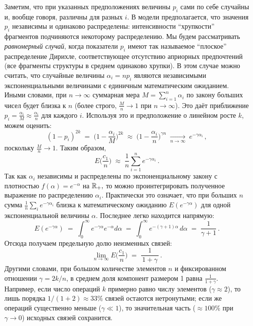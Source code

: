 Заметим, что при указанных предположениях величины $p_i$ сами по себе случайны и, вообще говоря, различны для разных $i$. В модели предполагается, что значения $p_i$ независимы и одинаково распределены: интенсивности ``хрупкости'' фрагментов подчиняются некоторому распределению. Мы будем рассматривать \emph{равномерный случай}, когда показатели $p_i$ имеют так называемое ``плоское'' распределение Дирихле, соответствующее отсутствию априорных предпочтений (все фрагменты структуры в среднем одинаково хрупки). В этом случае можно считать, что случайные величины $\alpha_i = n p_i$ являются независимыми экспоненциальными величинами с единичным математическим ожиданием. Иными словами, при $n \to \infty$ суммарная мера $M = \sum_{i=1}^n \alpha_i$ по закону больших чисел будет близка к $n$ (более строго, $\frac{M}{n} \to 1$ при $n \to \infty$). Это даёт приближение $p_i = \frac{\alpha_i}{M} \approx \frac{\alpha_i}{n}$ для каждого $i$. Используя это и предположение о линейном росте $k$, можем оценить:
\[
(1 - p_i)^{2k} \;=\; \Big(1 - \frac{\alpha_i}{M}\Big)^{2k} \;\approx\; \Big(1 - \frac{\alpha_i}{n}\Big)^{\gamma n} \;\xrightarrow[n \to \infty]{}\; e^{-\gamma \alpha_i}\,,
\] 
поскольку $\frac{M}{n} \to 1$. Таким образом, 
\[
E\!\Big(\frac{c_1}{n}\Big) \;\approx\; \frac{1}{n}\sum_{i=1}^n e^{-\gamma \alpha_i}\,. 
\]
Так как $\alpha_i$ независимы и распределены по экспоненциальному закону с плотностью $f(\alpha) = e^{-\alpha}$ на $\mathbb{R}_+,$ то можно проинтегрировать полученное выражение по распределению $\alpha_i$. Практически это означает, что при больших $n$ сумма $\frac{1}{n}\sum_{i} e^{-\gamma \alpha_i}$ близка к математическому ожиданию $E(e^{-\gamma \alpha})$ для одной экспоненциальной величины $\alpha$. Последнее легко находится напрямую:
\[
E(e^{-\gamma \alpha}) \;=\; \int_{0}^{\infty} e^{-\gamma \alpha} e^{-\alpha} d\alpha \;=\; \int_{0}^{\infty} e^{-(\gamma+1)\alpha}\, d\alpha \;=\; \frac{1}{\gamma+1}\,.
\] 
Отсюда получаем предельную долю неизменных связей:
\[
\lim_{n \to \infty} E\!\Big(\frac{c_1}{n}\Big) \;=\; \frac{1}{\,1 + \gamma\,}\,.
\] 
Другими словами, при большом количестве элементов $n$ и фиксированном отношении $\gamma = 2k/n$, в среднем доля компонент размером 1 равна $\frac{1}{1+\gamma}$. Например, если число операций $k$ примерно равно числу элементов ($\gamma \approx 2$), то лишь порядка $1/(1+2) \approx 33\%$ связей остаются нетронутыми; если же операций существенно меньше ($\gamma \ll 1$), то значительная часть ($\approx 100\%$ при $\gamma \to 0$) исходных связей сохранится.

